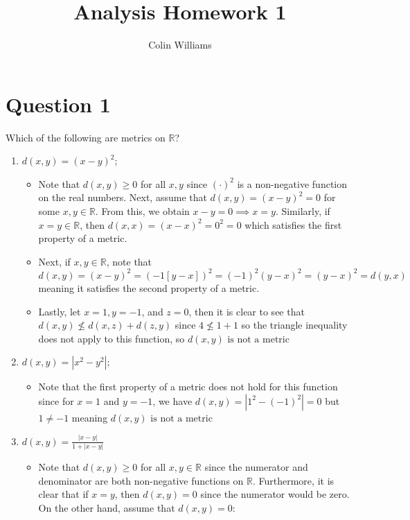 \documentclass[10pt,a4paper]{article}
\title{Analysis Homework 1}
\author{Colin Williams}
\theoremstyle{definition}
\theoremstyle{definition}
\begin{document}
\maketitle

\section*{Question 1}
Which of the following are metrics on $\mathbb{R}$?
\begin{enumerate}[label = (\alph*)]
\item $d(x, y) = (x - y)^2$;
	\begin{itemize}
	\item Note that $d(x, y) \geq 0$ for all $x, y$ since $(\cdot)^2$ is a non-negative function on the real numbers. Next, assume that $d(x, y) = (x - y)^2 = 0$ for some $x, y \in \mathbb{R}$. From this, we obtain $x - y = 0 \implies x = y$. Similarly, if $x = y \in \mathbb{R}$, then $d(x, x) = (x - x)^2 = 0^2 = 0$ which satisfies the first property of a metric. 
	\item Next, if $x, y \in \mathbb{R}$, note that $d(x, y) = (x - y)^2 = (-1[y - x])^2 = (-1)^2 (y - x)^2 = (y - x)^2 = d(y, x)$ meaning it satisfies the second property of a metric. 
	\item Lastly, let $x = 1, y = -1$, and $z = 0$, then it is clear to see that $d(x, y) \not \leq d(x, z) + d(z, y)$ since $4 \not \leq 1 + 1$ so the triangle inequality does not apply to this function, so $\boxed{d(x, y) \text{ is not a metric}}$
	\end{itemize}
\item $d(x, y) = |x^2 - y^2|$;
	\begin{itemize}
	\item Note that the first property of a metric does not hold for this function since for $x = 1$ and $y = -1$, we have $d(x, y) = |1^2 - (-1)^2| = 0$ but $1 \neq -1$ meaning $\boxed{d(x, y) \text{ is not a metric}}$
	\end{itemize}
\item $\displaystyle d(x, y) = \frac{|x - y|}{1 + |x - y|}$
	\begin{itemize}
	\item Note that $d(x, y) \geq 0$ for all $x, y \in \mathbb{R}$ since the numerator and denominator are both non-negative functions on $\mathbb{R}$. Furthermore, it is clear that if $x = y$, then $d(x, y) = 0$ since the numerator would be zero. On the other hand, assume that $d(x, y) = 0$:
	\begin{align*}

\end{align*}
\end{itemize}
\end{enumerate}
\end{document}
